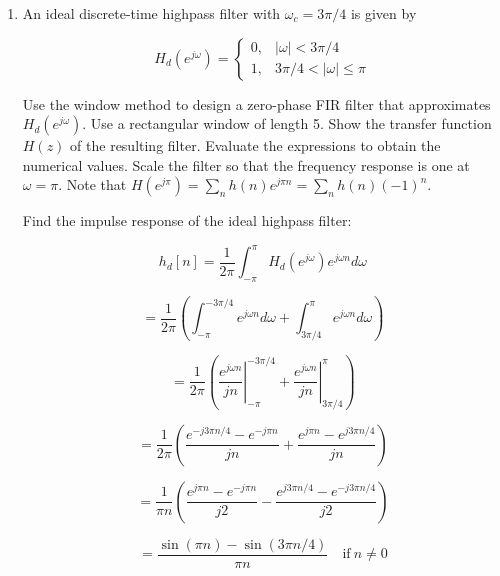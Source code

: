 \documentclass[fleqn]{article}
\begin{document}
\begin{enumerate}[nolistsep]
		\item An ideal discrete-time highpass filter with $\omega_c = 3\pi/4$ is given by
		
		\begin{equation*}
			H_d(e^{j\omega}) = 
			\begin{cases}
				0, & |\omega| < 3\pi/4 \\
				1, & 3\pi/4 < |\omega| \leq \pi
			\end{cases}
		\end{equation*}
		
		Use the window method to design a zero-phase FIR filter that approximates $H_d(e^{j\omega})$. Use a rectangular window of length 5. Show the transfer function $H(z)$ of the resulting filter. Evaluate the expressions to obtain the numerical values. Scale the filter so that the frequency response is one at $\omega = \pi$. Note that $H(e^{j\pi}) = \sum_{n}{h(n)e^{j{\pi}n}} = \sum_{n}{h(n)(-1)^n}$.
		
		Find the impulse response of the ideal highpass filter:
		
		\begin{equation*}
			h_d[n] = \frac{1}{2\pi}\int_{-\pi}^{\pi}{H_d(e^{j\omega})e^{j{\omega}n}}d\omega
		\end{equation*}
		
		\begin{equation*}
			= \frac{1}{2\pi}\left(\int_{-\pi}^{-3\pi/4}{e^{j{\omega}n}d\omega} + \int_{3\pi/4}^{\pi}{e^{j{\omega}n}d\omega}\right)
		\end{equation*}
		
		\begin{equation*}
			= \frac{1}{2\pi}\left(\left.\frac{e^{j{\omega}n}}{jn}\right\vert_{-\pi}^{-3\pi/4} + \left.\frac{e^{j{\omega}n}}{jn}\right\vert_{3\pi/4}^{\pi}\right)
		\end{equation*}
		
		\begin{equation*}
			= \frac{1}{2\pi}\left(\frac{e^{-j3{\pi}n/4} - e^{-j{\pi}n}}{jn} + \frac{e^{j{\pi}n} - e^{j3{\pi}n/4}}{jn}\right)
		\end{equation*}
		
		\begin{equation*}
			= \frac{1}{{\pi}n}\left(\frac{e^{j{\pi}n} - e^{-j{\pi}n}}{j2} - \frac{e^{j3{\pi}n/4} - e^{-j3{\pi}n/4}}{j2}\right)
		\end{equation*}
		
		\begin{equation*}
			= \frac{\sin{({\pi}n)} - \sin{(3{\pi}n/4)}}{{\pi}n} \quad {\text{if}}\ n \neq 0
		\end{equation*}
		

\end{enumerate}
\end{document}
